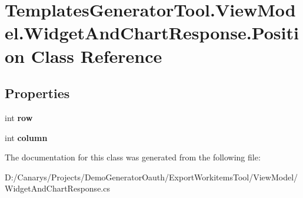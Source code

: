 \hypertarget{class_templates_generator_tool_1_1_view_model_1_1_widget_and_chart_response_1_1_position}{}\section{Templates\+Generator\+Tool.\+View\+Model.\+Widget\+And\+Chart\+Response.\+Position Class Reference}
\label{class_templates_generator_tool_1_1_view_model_1_1_widget_and_chart_response_1_1_position}
\subsection*{Properties}
\begin{DoxyCompactItemize}
\item 
\mbox{\label{class_templates_generator_tool_1_1_view_model_1_1_widget_and_chart_response_1_1_position_a4d19c60f9ddb7937a047d4e906a18f85}} 
int {\bfseries row}
\item 
\mbox{\label{class_templates_generator_tool_1_1_view_model_1_1_widget_and_chart_response_1_1_position_a983021e38e6e4eaaffb333e1cbb11232}} 
int {\bfseries column}
\end{DoxyCompactItemize}


The documentation for this class was generated from the following file\+:\begin{DoxyCompactItemize}
\item 
D\+:/\+Canarys/\+Projects/\+Demo\+Generator\+Oauth/\+Export\+Workitems\+Tool/\+View\+Model/Widget\+And\+Chart\+Response.\+cs\end{DoxyCompactItemize}
